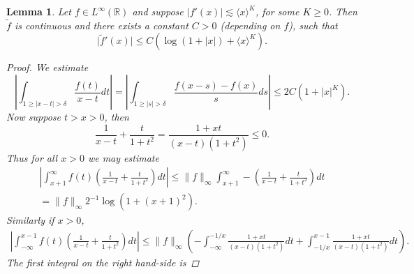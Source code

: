 \documentclass{article}[12pt]
\newcommand{\norm}[1]{\lVert#1\rVert}
\newtheorem{lemma}{Lemma}
\theoremstyle{remark}
\begin{document}
\begin{lemma}\label{lemma:est_H_transform}
            Let $f \in L^{\infty}(\mathbb{R})$ and suppose $\lvert f'(x) \rvert \lesssim \langle x \rangle^{K}$, for some $K \geq 0$. Then $\widetilde{f}$ is continuous and there exists a constant $C > 0$ (depending on $f$), such that
            \begin{equation*}
                \lvert \widetilde{f}'(x) \rvert \leq C (\log(1+\lvert x\rvert) + \langle x \rangle^{K}).
            \end{equation*}
            \begin{proof}
                We estimate
                \begin{equation*}
                    \left\lvert \int_{1 \geq\lvert x - t \rvert > \delta}\frac{f(t)}{x-t} dt \right\rvert = \left\lvert \int_{1 \geq\lvert s \rvert > \delta}\frac{f(x-s)-f(x)}{s}ds\right\rvert \leq 2C(1+\lvert x \rvert^{K}).
                \end{equation*}
                Now suppose $t > x > 0$, then
                \begin{equation*}
                    \frac{1}{x-t} + \frac{t}{1+t^{2}} = \frac{1+xt}{(x-t)(1+t^{2})} \leq 0.
                \end{equation*}
                Thus for all $x > 0$ we may estimate
                \begin{equation*}
                \begin{split}
                    \left\lvert \int_{x+1}^{\infty} f(t)\left(\frac{1}{x-t} + \frac{t}{1+t^{2}}\right) dt \right\rvert \leq \norm{f}_{\infty} \int_{x+1}^{\infty} -\left(\frac{1}{x-t} + \frac{t}{1+t^{2}}\right)dt \\ = \norm{f}_{\infty} 2^{-1}\log (1+(x+1)^{2}).
                \end{split}
                \end{equation*}
                Similarly if $x > 0$,
                \begin{equation*}
                    \begin{split}
                    \left \lvert \int_{-\infty}^{x-1} f(t) \left(\frac{1}{x-t} + \frac{t}{1+t^{2}}\right)dt \right\rvert \leq \norm{f}_{\infty} \left( -\int_{-\infty}^{-1/x} \frac{1+xt}{(x-t)(1+t^{2})}dt + \int_{-1/x}^{x-1}\frac{1+xt}{(x-t)(1+t^{2})}dt\right).
                    \end{split}
                \end{equation*}
                The first integral on the right hand-side is

\end{proof}
\end{lemma}
\end{document}
